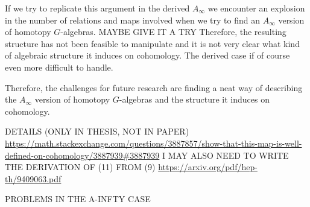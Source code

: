 \documentclass[join.tex]{subfiles}
\begin{document}
If we try to replicate this argument in the derived $A_\infty$ we encounter an explosion in the number of relations and maps involved when we try to find an $A_\infty$ version of homotopy $G$-algebras. MAYBE GIVE IT A TRY Therefore, the resulting structure has not been feasible to manipulate and it is not very clear what kind of algebraic structure it induces on cohomology. The derived case if of course even more difficult to handle.

Therefore, the challenges for future research are finding a neat way of describing the $A_\infty$ version of homotopy $G$-algebras and the structure it induces on cohomology.


DETAILS (ONLY IN THESIS, NOT IN PAPER)
\url{https://math.stackexchange.com/questions/3887857/show-that-this-map-is-well-defined-on-cohomology/3887939#3887939}%
I MAY ALSO NEED TO WRITE THE DERIVATION OF (11) FROM (9)
\url{https://arxiv.org/pdf/hep-th/9409063.pdf}

PROBLEMS IN THE A-INFTY CASE
%
%
%
%
%
\end{document}
